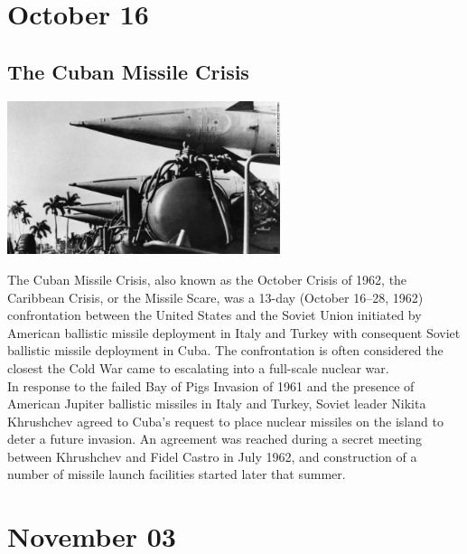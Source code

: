 \documentclass[11pt]{report}
\begin{document}
\section{October 16}
\subsection{The Cuban Missile Crisis}
\vspace{2mm}\begin{center}\includegraphics[width=8cm]{./img/cubaMissileCsis.jpg}\end{center}
The Cuban Missile Crisis, also known as the October Crisis of 1962, the Caribbean Crisis, or the Missile Scare, was a 13-day (October 16–28, 1962) confrontation between the United States and the Soviet Union initiated by American ballistic missile deployment in Italy and Turkey with consequent Soviet ballistic missile deployment in Cuba. The confrontation is often considered the closest the Cold War came to escalating into a full-scale nuclear war.\\
\indent In response to the failed Bay of Pigs Invasion of 1961 and the presence of American Jupiter ballistic missiles in Italy and Turkey, Soviet leader Nikita Khrushchev agreed to Cuba's request to place nuclear missiles on the island to deter a future invasion. An agreement was reached during a secret meeting between Khrushchev and Fidel Castro in July 1962, and construction of a number of missile launch facilities started later that summer.
\section{November 03}
\end{document}
